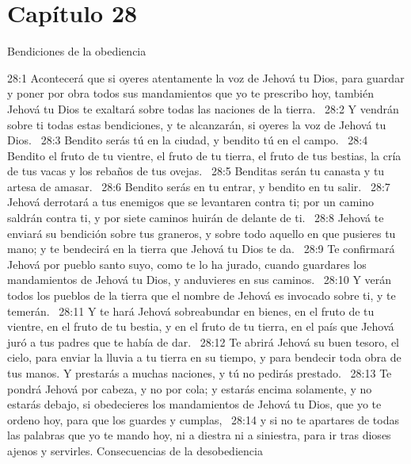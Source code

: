 \section*{Capítulo 28}
Bendiciones de la obediencia  


28:1 Acontecerá que si oyeres atentamente la voz de Jehová tu Dios, para guardar y poner por obra todos sus mandamientos que yo te prescribo hoy, también Jehová tu Dios te exaltará sobre todas las naciones de la tierra.  
28:2 Y vendrán sobre ti todas estas bendiciones, y te alcanzarán, si oyeres la voz de Jehová tu Dios.  
28:3 Bendito serás tú en la ciudad, y bendito tú en el campo.  
28:4 Bendito el fruto de tu vientre, el fruto de tu tierra, el fruto de tus bestias, la cría de tus vacas y los rebaños de tus ovejas.  
28:5 Benditas serán tu canasta y tu artesa de amasar.  
28:6 Bendito serás en tu entrar, y bendito en tu salir.  
28:7 Jehová derrotará a tus enemigos que se levantaren contra ti; por un camino saldrán contra ti, y por siete caminos huirán de delante de ti.  
28:8 Jehová te enviará su bendición sobre tus graneros, y sobre todo aquello en que pusieres tu mano; y te bendecirá en la tierra que Jehová tu Dios te da.  
28:9 Te confirmará Jehová por pueblo santo suyo, como te lo ha jurado, cuando guardares los mandamientos de Jehová tu Dios, y anduvieres en sus caminos.  
28:10 Y verán todos los pueblos de la tierra que el nombre de Jehová es invocado sobre ti, y te temerán.  
28:11 Y te hará Jehová sobreabundar en bienes, en el fruto de tu vientre, en el fruto de tu bestia, y en el fruto de tu tierra, en el país que Jehová juró a tus padres que te había de dar.  
28:12 Te abrirá Jehová su buen tesoro, el cielo, para enviar la lluvia a tu tierra en su tiempo, y para bendecir toda obra de tus manos. Y prestarás a muchas naciones, y tú no pedirás prestado.  
28:13 Te pondrá Jehová por cabeza, y no por cola; y estarás encima solamente, y no estarás debajo, si obedecieres los mandamientos de Jehová tu Dios, que yo te ordeno hoy, para que los guardes y cumplas,  
28:14 y si no te apartares de todas las palabras que yo te mando hoy, ni a diestra ni a siniestra, para ir tras dioses ajenos y servirles. 
Consecuencias de la desobediencia  

